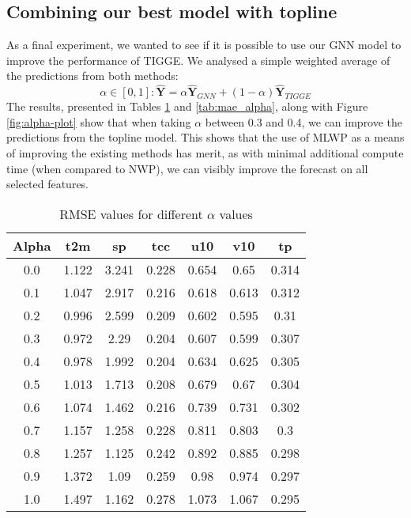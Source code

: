 \subsection{Combining our best model with topline}
As a final experiment, we wanted to see if it is possible to use our GNN model to improve the performance of TIGGE. We analysed a simple weighted average of the predictions from both methods:
\[
    \alpha \in [0,1]: \mathbf{\hat{Y}} = \alpha \mathbf{\hat{Y}}_{GNN} + (1 - \alpha) \mathbf{\hat{Y}}_{TIGGE} 
\]
The results, presented in Tables \ref{tab:rmse_alpha} and \ref{tab:mae_alpha}, along with Figure \ref{fig:alpha-plot} show that when taking $\alpha$ between 0.3 and 0.4, we can improve the predictions from the topline model. This shows that the use of MLWP as a means of improving the existing methods has merit, as with minimal additional compute time (when compared to NWP), we can  visibly improve the forecast on all selected features.

\begin{table}[htbp]
    \centering
    \begin{tabular}{ccccccc}
        \toprule
        Alpha & t2m & sp & tcc & u10 & v10 & tp \\
        \midrule
        0.0 & 1.122 & 3.241 & 0.228 & 0.654 & 0.65 & 0.314 \\
        0.1 & 1.047 & 2.917 & 0.216 & 0.618 & 0.613 & 0.312 \\
        0.2 & 0.996 & 2.599 & 0.209 & 0.602 & 0.595 & 0.31 \\
        0.3 & 0.972 & 2.29 & 0.204 & 0.607 & 0.599 & 0.307 \\
        0.4 & 0.978 & 1.992 & 0.204 & 0.634 & 0.625 & 0.305 \\
        0.5 & 1.013 & 1.713 & 0.208 & 0.679 & 0.67 & 0.304 \\
        0.6 & 1.074 & 1.462 & 0.216 & 0.739 & 0.731 & 0.302 \\
        0.7 & 1.157 & 1.258 & 0.228 & 0.811 & 0.803 & 0.3 \\
        0.8 & 1.257 & 1.125 & 0.242 & 0.892 & 0.885 & 0.298 \\
        0.9 & 1.372 & 1.09 & 0.259 & 0.98 & 0.974 & 0.297 \\
        1.0 & 1.497 & 1.162 & 0.278 & 1.073 & 1.067 & 0.295 \\
        \bottomrule
    \end{tabular}
    \caption{RMSE values for different $\alpha$ values}
    \label{tab:rmse_alpha}
\end{table}

